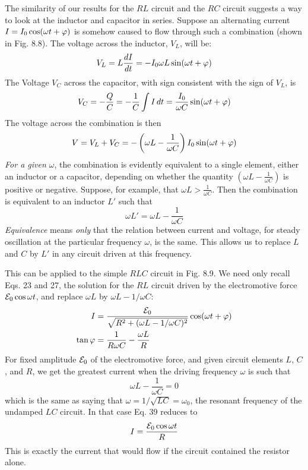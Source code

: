 The similarity of our results for the $RL$ circuit and the $RC$ circuit
suggests a way to look at the inductor and capacitor in series.
Suppose an alternating current $I = I_0 \cos (\omega t + \varphi)$ is somehow
caused to flow through such a combination (shown in Fig. 8.8). The
voltage across the inductor, $V_L$, will be:
\begin{equation}
  V_L = L\frac{\mathop{d\!} I}{\mathop{d\!} t} = -I_0\omega L\sin(\omega t+\varphi)
\end{equation}
The Voltage $V_C$ across the capacitor, with sign consistent with the sign
of $V_L$, is
\begin{equation}
  V_C = -\frac{Q}{C} = -\frac{1}{C}\int I\mathop{d\!} t = \frac{I_0}{\omega C}\sin(\omega t+\varphi)
\end{equation}
The voltage across the combination is then
\begin{equation}
  V = V_L+V_C = -\left(\omega L-\frac{1}{\omega C}\right)I_0\sin(\omega t+\varphi)
\end{equation}
\emph{For a given $\omega$}, the combination is evidently equivalent to a single 
element, either an inductor or a capacitor, depending on whether the
quantity $\left(\omega L-\frac{1}{\omega C}\right)$ is positive or negative. Suppose, for example,
that $\omega L>\frac{1}{\omega C}$.  Then the combination is equivalent to an inductor
$L'$ such that
\begin{equation}
  \omega L' = \omega L-\frac{1}{\omega C}
\end{equation}
\emph{Equivalence} means \emph{only} that the relation between current and
voltage, for steady oscillation at the particular frequency $\omega$, is the
same. This allows us to replace $L$ and $C$ by $L'$ in any circuit driven
at this frequency.

This can be applied to the simple $RLC$ circuit in Fig. 8.9. We need
only recall Eqs. 23 and 27, the solution for the $RL$ circuit driven by
the electromotive force $\mathcal{E}_0 \cos \omega t$, and replace $\omega L$ by $\omega L - 1/\omega C$:
\begin{align}
  I &= \frac{\mathcal{E}_0}{\sqrt{R^2+(\omega L - 1/\omega C)^2}}\cos(\omega t+\varphi) \\
  \tan\varphi &= \frac{1}{R\omega C}-\frac{\omega L}{R}
\end{align}
For fixed amplitude $\mathcal{E}_0$ of the electromotive force, and given circuit
elements $L$, $C$, and $R$, we get the greatest current when the driving
frequency $\omega$ is such that
\begin{equation}
  \omega L - \frac{1}{\omega C} = 0
\end{equation}
which is the same as saying that $\omega = 1/\sqrt{LC}=\omega_0$, the resonant
frequency of the undamped $LC$ circuit. In that case Eq. 39 reduces to
\begin{equation}
  I =  \frac{\mathcal{E}_0\cos\omega t}{R}
\end{equation}
This is exactly the current that would flow if the circuit contained
the resistor alone.

